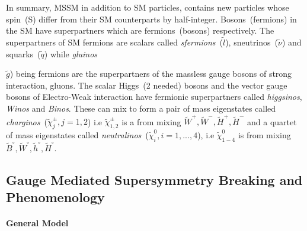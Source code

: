 In summary, MSSM in addition to SM particles, contains new particles whose spin~(S) differ from their SM counterparts by half-integer. Bosons~(fermions) in the SM have superpartners which are fermions~(bosons) respectively.
The superpartners of SM fermions are scalars called \textit{sfermions}~($\tilde{l}$), sneutrinos~($\tilde{\nu}$) and squarks~($\tilde{q}$) while \textit{gluinos}~{$\tilde{g}$) being fermions are the superpartners of the massless gauge bosons of strong interaction, gluons. The scalar Higgs~(2 needed) bosons and the vector gauge bosons of Electro-Weak interaction have fermionic superpartners called \textit{higgsinos}, \textit{Winos} and \textit{Binos}. These can mix to form a pair of mass eigenstates called \textit{charginos}~($\tilde{\chi}^{\pm}_{j}, j=1,2$) i.e 
$\tilde{\chi}^{\pm}_{1,2}$ is a from mixing $\tilde{W}^{+}, \tilde{W}^{-}, \tilde{H}^{+}, \tilde{H}^{-} $ and a quartet of mass  eigenstates called \textit{neutralinos}~($\tilde{\chi}^{0}_{i}, i=1,...,4$), i.e $\tilde{\chi}^{0}_{1-4}$ is from mixing $\tilde{B}^{\circ}, \tilde{W}^{\circ}, \tilde{h}^{\circ}, \tilde{H}^{\circ} $.
\subsection{Gauge Mediated Supersymmetry Breaking and Phenomenology}
\paragraph{General Model}
}

